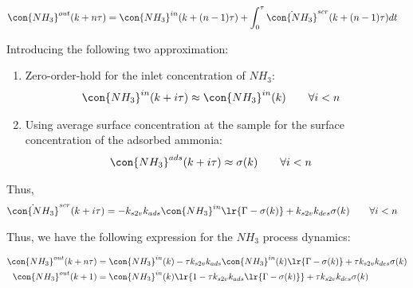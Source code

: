 \begin{align*}
    \con{NH_3}^{out} (k + n\tau) &= \con{NH_3}^{in} (k + (n-1)\tau) + \int_{0}^{\tau}  \dot{\con{NH_3}}^{scr} (k + (n-1)\tau) dt
\end{align*}

Introducing the following two approximation:
\begin{enumerate}
    \item Zero-order-hold for the inlet concentration of $NH_3$:
        \begin{align*}
            \con{NH_3}^{in} (k + i \tau) &\approx \con{NH_3}^{in} (k) \qquad \forall i < n
        \end{align*}
    \item Using average surface concentration at the sample for the surface concentration of the adsorbed ammonia:
        \begin{align*}
            \con{NH_3}^{ads} (k + i \tau) &\approx \sigma(k) \qquad \forall i < n
        \end{align*}
\end{enumerate}

Thus,
\begin{align*}
    \dot{\con{NH_3}}^{scr} (k + i \tau) &= -k_{s2v}k_{ads} \con{NH_3}^{in} \lr{\Gamma - \sigma(k)} + k_{s2v} k_{des} \sigma(k)
    \qquad \forall i < n
\end{align*}


Thus, we have the following expression for the $NH_3$ process dynamics:

\begin{align*}
    \con{NH_3}^{out} (k + n\tau) &= \con{NH_3}^{in} (k) - \tau k_{s2v}k_{ads} \con{NH_3}^{in}(k) \lr{\Gamma - \sigma(k)} + \tau k_{s2v} k_{des} \sigma(k)\\
    \con{NH_3}^{out} (k + 1) &= \con{NH_3}^{in}(k) \lr{1 - \tau k_{s2v}k_{ads} \lr{\Gamma - \sigma(k)}} + \tau k_{s2v} k_{des} \sigma(k)
\end{align*}
